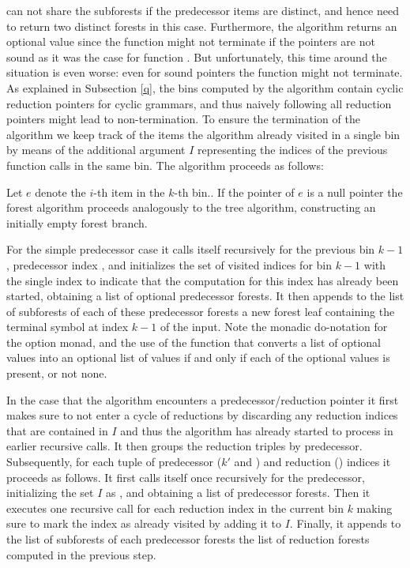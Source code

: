 \begin{isabellebody}
\begin{isamarkuptext}
can not share the subforests if the predecessor items are distinct, and hence need to return two distinct forests in this case. Furthermore, the algorithm returns an
optional value since the function might not terminate if the pointers are not sound as it was the case
for function . But unfortunately, this time around the situation is even worse:
even for sound pointers the function  might not terminate.
As explained in Subsection \ref{q}, the bins computed by the algorithm  contain
cyclic reduction pointers for cyclic grammars, and thus naively following all reduction pointers might lead
to non-termination. To ensure the termination of the algorithm we keep track of the items the algorithm
already visited in a single bin by means of the additional argument $I$ representing the indices
of the previous function calls in the same bin. The algorithm proceeds as follows:

Let $e$ denote the $i$-th item in the $k$-th bin.. If the pointer of $e$ is
a null pointer the forest algorithm proceeds analogously to the tree algorithm, constructing an initially
empty forest branch.

For the simple predecessor case it calls itself recursively for the previous bin
$k-1$, predecessor index , and initializes the set of visited indices for bin $k-1$ with
the single index  to indicate that the computation for this index has already been started, obtaining a list of optional predecessor forests. It then appends
to the list of subforests of each of these predecessor forests a new forest leaf containing the terminal symbol at
index $k-1$ of the input. Note the monadic do-notation for the option monad, and the use
of the function  that converts a list of optional values into an optional list of values
if and only if each of the optional values is present, or not none.

In the case that the algorithm
encounters a predecessor/reduction pointer it first makes sure to not enter a cycle of reductions
by discarding any reduction indices that are contained in $I$ and thus the algorithm has already started to process in earlier
recursive calls. It then groups the reduction triples by predecessor. Subsequently, for each tuple of predecessor
($k'$ and ) and reduction () indices it proceeds as follows. It first calls itself once recursively
for the predecessor, initializing the set $I$ as , and obtaining a list of predecessor
forests. Then it executes one recursive call for each reduction index 
in the current bin $k$ making sure to mark the index  as already visited by adding it to $I$.
Finally, it appends to the list of subforests of each predecessor forests the list of reduction forests
computed in the previous step.


\end{isamarkuptext}
\end{isabellebody}
